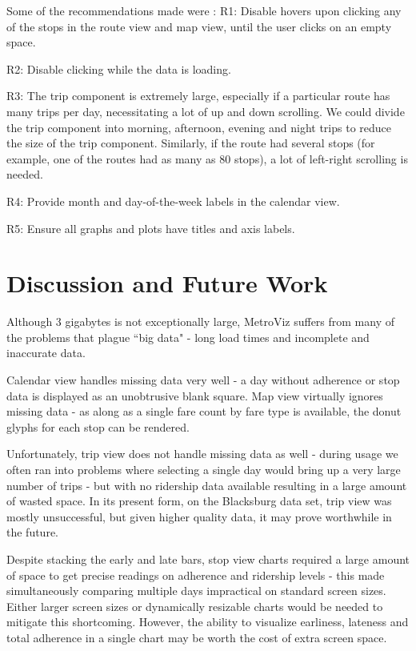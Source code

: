 \documentclass[journal]{vgtc}                %
\begin{document}
Some of the recommendations made were : 
R1: Disable hovers upon clicking any of the stops in the route view and map view, until the user clicks on an empty space. 

R2: Disable clicking while the data is loading. 

R3: The trip component is extremely large, especially if a particular route has many trips per day, necessitating a lot of up and down scrolling. We could divide the trip component into morning, afternoon, evening and night trips to reduce the size of the trip component. Similarly, if the route had several stops (for example, one of the routes had as many as 80 stops), a lot of left-right scrolling is needed. 

R4: Provide month and day-of-the-week labels in the calendar view. 

R5: Ensure all graphs and plots have titles and axis labels.

\section{Discussion and Future Work}
Although 3 gigabytes is not exceptionally large, MetroViz suffers from many of the problems that plague ``big data" - long load times and incomplete and inaccurate data.

Calendar view handles missing data very well - a day without adherence or stop data is displayed as an unobtrusive blank square. Map view virtually ignores missing data - as along as a single fare count by fare type is available, the donut glyphs for each stop can be rendered.

Unfortunately, trip view does not handle missing data as well - during usage we often ran into problems where selecting a single day would bring up a very large number of trips - but with no ridership data available resulting in a large amount of wasted space. In its present form, on the Blacksburg data set, trip view was mostly unsuccessful, but given higher quality data, it may prove worthwhile in the future.

Despite stacking the early and late bars, stop view charts required a large amount of space to get precise readings on adherence and ridership levels - this made simultaneously comparing multiple days impractical on standard screen sizes. Either larger screen sizes or dynamically resizable charts would be needed to mitigate this shortcoming. However, the ability to visualize earliness, lateness and total adherence in a single chart may be worth the cost of extra screen space.
\end{document}
